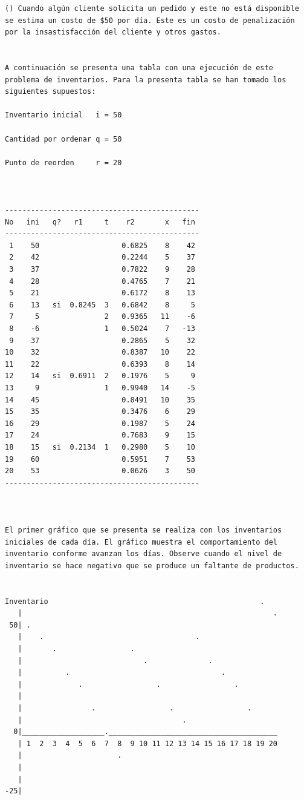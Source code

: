 \begin{verbatim}
() Cuando algún cliente solicita un pedido y este no está disponible se estima un costo de $50 por día. Este es un costo de penalización por la insastisfacción del cliente y otros gastos.


A continuación se presenta una tabla con una ejecución de este problema de inventarios. Para la presenta tabla se han tomado los siguientes supuestos:

Inventario inicial   i = 50

Cantidad por ordenar q = 50

Punto de reorden     r = 20



---------------------------------------------
No   ini   q?   r1     t    r2       x   fin
---------------------------------------------
 1    50                   0.6825    8    42
 2    42                   0.2244    5    37
 3    37                   0.7822    9    28
 4    28                   0.4765    7    21
 5    21                   0.6172    8    13
 6    13   si  0.8245  3   0.6842    8     5
 7     5               2   0.9365   11    -6
 8    -6               1   0.5024    7   -13
 9    37                   0.2865    5    32
10    32                   0.8387   10    22
11    22                   0.6393    8    14
12    14   si  0.6911  2   0.1976    5     9
13     9               1   0.9940   14    -5
14    45                   0.8491   10    35
15    35                   0.3476    6    29
16    29                   0.1987    5    24
17    24                   0.7683    9    15
18    15   si  0.2134  1   0.2980    5    10
19    60                   0.5951    7    53
20    53                   0.0626    3    50
---------------------------------------------



El primer gráfico que se presenta se realiza con los inventarios iniciales de cada día. El gráfico muestra el comportamiento del inventario conforme avanzan los días. Observe cuando el nivel de inventario se hace negativo que se produce un faltante de productos. 


Inventario                                                 .
   |                                                          .
 50| .
   |    .                                   .
   |       .                 .
   |                            .              .
   |          .                                   .
   |             .                 .                 .
   |
   |                .                 .                 .
   |                                     .
  0|___________________._______________________________________
   | 1  2  3  4  5  6  7  8  9 10 11 12 13 14 15 16 17 18 19 20
   |                      .
   |
   |
-25|




\end{verbatim}
